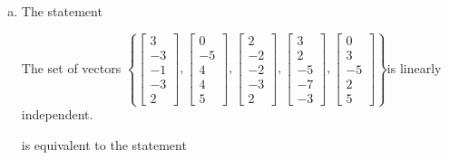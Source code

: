 \begin{exerciseAnswer}
\begin{enumerate}[(a)]
\item The statement 
\begin{center}\begin{minipage}{0.8\textwidth}
 The set of vectors \( \left\{ \left[\begin{array}{c}
3 \\
-3 \\
-1 \\
-3 \\
2
\end{array}\right] , \left[\begin{array}{c}
0 \\
-5 \\
4 \\
4 \\
5
\end{array}\right] , \left[\begin{array}{c}
2 \\
-2 \\
-2 \\
-3 \\
2
\end{array}\right] , \left[\begin{array}{c}
3 \\
2 \\
-5 \\
-7 \\
-3
\end{array}\right] , \left[\begin{array}{c}
0 \\
3 \\
-5 \\
2 \\
5
\end{array}\right] \right\} \)is linearly independent.
\end{minipage}\end{center}
     is equivalent to the statement 
\begin{center}\begin{minipage}{0.8\textwidth}
 The vector equation \( x_{1} \left[\begin{array}{c}
3 \\
-3 \\
-1 \\
-3 \\
2
\end{array}\right] + x_{2} \left[\begin{array}{c}
0 \\
-5 \\

\end{array}
\end{minipage}
\end{center}
\end{enumerate}
\end{exerciseAnswer}
